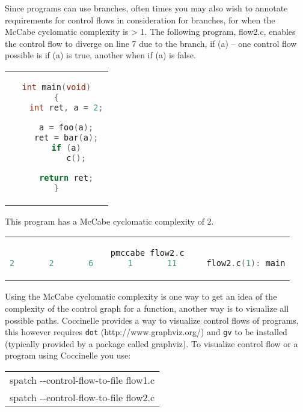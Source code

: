 Since programs can use branches, often times you may also wish to annotate
requirements for control flows in consideration for branches, for when
the McCabe cyclomatic complexity is > 1. The following program, flow2.c,
enables the control flow to diverge on line 7 due to the branch, if (a) --
one control flow possible is if (a) is true, another when if (a) is false.

\begin{center}
\begin{tabular}{c}
\begin{lstlisting}[language=C]
int main(void)
{
	int ret, a = 2;

	a = foo(a);
	ret = bar(a);
	if (a)
		c();

	return ret;
}
\end{lstlisting}\\
\end{tabular}
\end{center}

This program has a McCabe cyclomatic complexity of 2.

\begin{center}
\begin{tabular}{c}
\begin{lstlisting}[language=C]
pmccabe flow2.c
2       2       6       1       11      flow2.c(1): main
\end{lstlisting}\\
\end{tabular}
\end{center}

Using the McCabe cyclomatic complexity is one way to get an idea of
the complexity of the control graph for a function, another way is
to visualize all possible paths. Coccinelle provides a way to visualize
control flows of programs, this however requires {\tt dot}
(http://www.graphviz.org/) and {\tt gv} to be installed (typically provided
by a package called graphviz). To visualize control flow or a program
using Coccinelle you use:

\begin{center}
\begin{tabular}{c}
spatch -{}-control-flow-to-file flow1.c \\
spatch -{}-control-flow-to-file flow2.c
\end{tabular}
\end{center}


